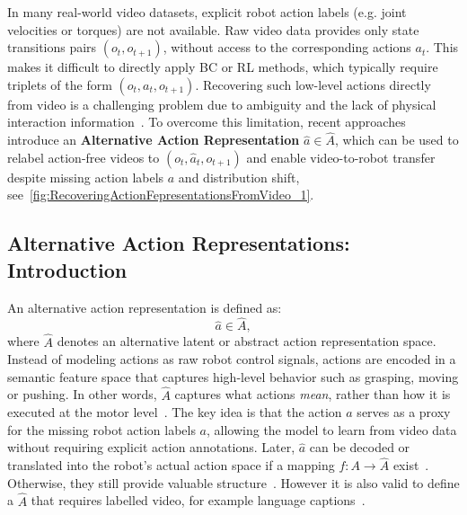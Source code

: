 In many real-world video datasets, explicit robot action labels (e.g. joint velocities or torques) are not available.
Raw video data provides only state transitions pairs $(o_t, o_{t+1})$, without access to the corresponding actions $a_t$. This makes it difficult to directly apply \ac{BC} or \ac{RL} methods, which typically require triplets of the form $(o_t, a_t, o_{t+1})$. Recovering such low-level actions directly from video is a challenging problem due to ambiguity and the lack of physical interaction information~\cite{McCarthy_2025}. 
To overcome this limitation, recent approaches introduce an \textbf{Alternative Action Representation} $\hat{a} \in \hat{A}$, which can be used to relabel action-free videos to $(o_t, \hat{a}_t, o_{t+1})$ and enable video-to-robot transfer despite missing action labels $a$ and distribution shift, see~\autoref{fig:RecoveringActionFepresentationsFromVideo_1}.


\subsection{Alternative Action Representations: Introduction}
An alternative action representation is defined as:
\begin{equation}
    \hat{a} \in \hat{A},
\end{equation}
where
$\hat{A}$ denotes an alternative latent or abstract action representation space. 
Instead of modeling actions as raw robot control signals, actions are encoded in a semantic feature space that captures high-level behavior such as grasping, moving or pushing. In other words, $\hat{A}$ captures what actions \textit{mean}, rather than how it is executed at the motor level~\cite{McCarthy_2025}.
The key idea is that the action $\hat{a}$ serves as a proxy for the missing robot action labels $a$, allowing the model to learn from video data without requiring explicit action annotations. Later, $\hat{a}$ can be decoded or translated into the robot's actual action space if a mapping $f: A \to \hat{A}$ exist~\cite{Wang2023MimicPlayLI, Wen2023AnypointTM, Du2023LearningUP}. Otherwise, they still provide valuable structure~\cite{Bhateja2023RoboticOR, Schmidt2023LearningTA}. However it is also valid to define a $\hat{A}$ that requires labelled video, for example language captions~\cite{McCarthy_2025}.


